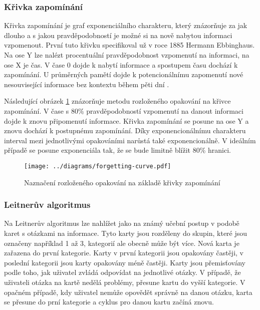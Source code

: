 \documentclass[a4paper,11pt,titlepage,fleqn]{article}
\begin{document}
        \subsubsection{Křivka zapomínání}
            Křivka zapomínání je graf exponenciálního charakteru, který znázorňuje za jak dlouho a s jakou pravděpodobností je možné si na nově nabytou informaci vzpomenout. První tuto křivku specifikoval už v roce 1885 Hermann Ebbinghaus. Na ose Y lze nalézt procentuální pravděpodobnost vzpomenutí na informaci, na ose X je čas. V čase 0 dojde k nabytí informace a spostupem času dochází k zapomínání. U průměrných pamětí dojde k potencionálnímu zapomenutí nové nesouvisející informace bez kontextu během pěti dní \cite{bib:ebbinghaus}.

            Následující obrázek \ref{fig:forgetting-curve} znázorňuje metodu rozloženého opakování na křivce zapomínání. V čase s 80\% pravděpodobností vzpomenutí na danout informaci dojde k znovu připomenutí informace. Křivka zapomínání se posune na ose Y a znovu dochází k postupnému zapomínání. Díky exponencionálnímu charakteru interval mezi jednotlivými opakováními narůstá také exponencionálně. V ideálním případě se posune exponenciála tak, že se bude limitně blížit 80\% hranici.

            \begin{figure}[ht!]
                \centering
                \texttt{[image: ../diagrams/forgetting-curve.pdf]}
                \caption{Naznačení rozloženého opakování na základě křivky zapomínání}
                \label{fig:forgetting-curve}
            \end{figure}
         
        \subsubsection{Leitnerův algoritmus}
            \label{leitner}
            Na Leitnerův algoritmus lze nahlížet jako na známý učební postup v podobě karet s otázkami na informace. Tyto karty jsou rozděleny do skupin, které jsou označeny například 1 až 3, kategorií ale obecně může být více. Nová karta je zařazena do první kategorie. Karty v první kategorii jsou opakovány častěji, v poslední kategorii jsou karty opakovány méně častěji. Karty jsou přemisťovány podle toho, jak uživatel zvládá odpovídat na jednotlivé otázky. V případě, že uživateli otázka na kartě nedělá problémy, přesune kartu do vyšší kategorie. V opačném případě, kdy uživatel nemůže opovědět správně na danou otázku, karta se přesune do prní kategorie a cyklus pro danou kartu začíná znovu.
\end{document}
